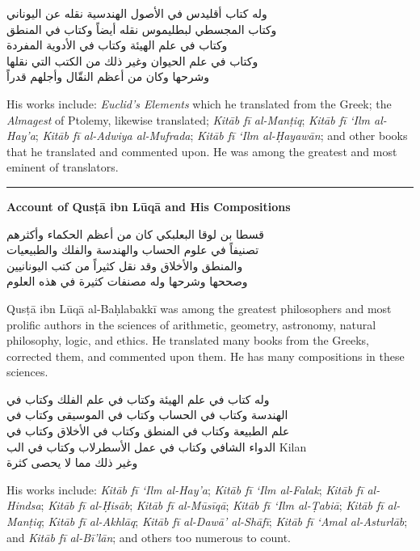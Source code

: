 \documentclass[11pt,a4paper]{article}
\newcommand{\longline}{\noindent\rule{\textwidth}{0.4pt}}
\newcommand{\ar}[1]{{\arabicfont\beginR #1\endR}}
\newcommand{\bilingual}[2]{%
  \noindent
  \begin{minipage}[t]{0.47\textwidth}
    \vspace{0pt}
    \begin{flushright}
    {\arabicfont\beginR #1\endR}
    \end{flushright}
  \end{minipage}%
  \hfill\vline\hfill
  \begin{minipage}[t]{0.47\textwidth}
    \vspace{0pt}
    #2
  \end{minipage}%
  \par\vspace{0.8em}
}
\newcommand{\bilingualsubsection}[2]{%
  \vspace{0.6em}%
  \noindent
  \begin{minipage}[t]{0.47\textwidth}
    \begin{flushright}
    \textbf{\color{sectioncolor}\ar{#1}}
    \end{flushright}
  \end{minipage}%
  \hfill
  \begin{minipage}[t]{0.47\textwidth}
    \textbf{\color{sectioncolor}#2}
  \end{minipage}%
  \par\vspace{0.4em}%
}
\begin{document}
\vspace{0.5em}
\bilingual
{وله كتاب أقليدس في الأصول الهندسية نقله عن اليوناني\\
وكتاب المجسطي لبطليموس نقله أيضاً وكتاب في المنطق\\
وكتاب في علم الهيئة وكتاب في الأدوية المفردة\\
وكتاب في علم الحيوان وغير ذلك من الكتب التي نقلها\\
وشرحها وكان من أعظم النقّال وأجلهم قدراً}
{His works include: \textit{Euclid's Elements} which he translated from
the Greek; the \textit{Almagest} of Ptolemy, likewise translated;
\textit{Kit\=ab f\=i al-Man\d{t}iq}; \textit{Kit\=ab f\=i \textquoteleft Ilm
al-Hay'a}; \textit{Kit\=ab f\=i al-Adwiya al-Mufrada};
\textit{Kit\=ab f\=i \textquoteleft Ilm al-\d{H}ayaw\=an}; and other books
that he translated and commented upon. He was among the greatest and
most eminent of translators.}

\vspace{1em}
\longline
\vspace{0.5em}

\bilingualsubsection{ذكر قسطا بن لوقا ومصنفاته}{Account of Qus\d{t}\=a ibn L\=uq\=a and His Compositions}

\vspace{0.5em}
\bilingual
{قسطا بن لوقا البعلبكي كان من أعظم الحكماء وأكثرهم\\
تصنيفاً في علوم الحساب والهندسة والفلك والطبيعيات\\
والمنطق والأخلاق وقد نقل كثيراً من كتب اليونانيين\\
وصححها وشرحها وله مصنفات كثيرة في هذه العلوم}
{Qus\d{t}\=a ibn L\=uq\=a al-Ba\d{h}labakk\=i was among the greatest
philosophers and most prolific authors in the sciences of arithmetic,
geometry, astronomy, natural philosophy, logic, and ethics. He
translated many books from the Greeks, corrected them, and commented
upon them. He has many compositions in these sciences.}

\vspace{0.5em}
\bilingual
{وله كتاب في علم الهيئة وكتاب في علم الفلك وكتاب في\\
الهندسة وكتاب في الحساب وكتاب في الموسيقى وكتاب في\\
علم الطبيعة وكتاب في المنطق وكتاب في الأخلاق وكتاب في\\
الدواء الشافي وكتاب في عمل الأسطرلاب وكتاب في الب Kilan\\
وغير ذلك مما لا يحصى كثرة}
{His works include: \textit{Kit\=ab f\=i \textquoteleft Ilm al-Hay'a};
\textit{Kit\=ab f\=i \textquoteleft Ilm al-Falak}; \textit{Kit\=ab f\=i
al-Hindsa}; \textit{Kit\=ab f\=i al-\d{H}is\=ab}; \textit{Kit\=ab f\=i
al-M\=us\=iq\=a}; \textit{Kit\=ab f\=i \textquoteleft Ilm al-\d{T}abi\={a}};
\textit{Kit\=ab f\=i al-Man\d{t}iq}; \textit{Kit\=ab f\=i
al-Akhl\=aq}; \textit{Kit\=ab f\=i al-Daw\=a' al-Sh\=af\=i};
\textit{Kit\=ab f\=i \textquoteleft Amal al-Asturl\=ab}; and
\textit{Kit\=ab f\=i al-B\=i'l\=an}; and others too numerous to count.}
\end{document}
